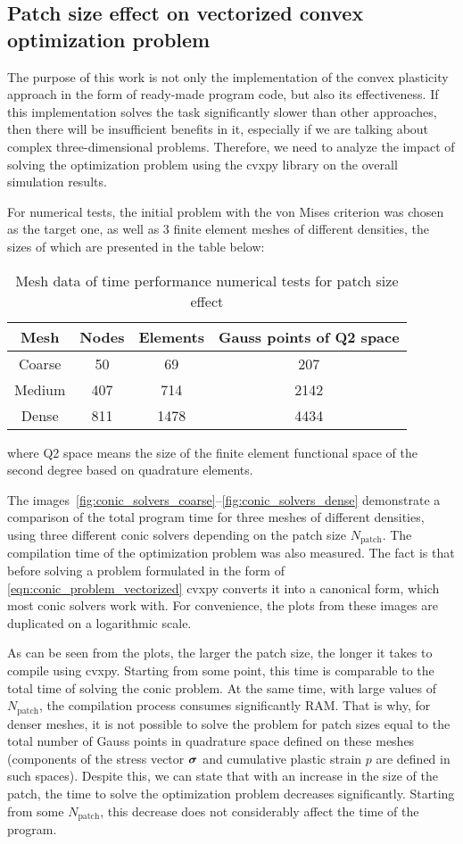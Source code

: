 \documentclass[12pt]{article}
\begin{document}
\subsection{Patch size effect on vectorized convex optimization problem}
The purpose of this work is not only the implementation of the convex plasticity approach in the form of ready-made program code, but also its effectiveness. If this implementation solves the task significantly slower than other approaches, then there will be insufficient benefits in it, especially if we are talking about complex three-dimensional problems. Therefore, we need to analyze the impact of solving the optimization problem using the cvxpy library on the overall simulation results. 

For numerical tests, the initial problem with the von Mises criterion was chosen as the target one, as well as 3 finite element meshes of different densities, the sizes of which are presented in the table below:

\begin{table}[H]
	\centering
	\begin{tabular}{|cccc|}
		\hline
		Mesh & Nodes & Elements & Gauss points of Q2 space \\
		\hline
		Coarse & 50	& 69 & 207 \\
		Medium & 407 & 714 & 2142 \\
		Dense & 811	& 1478 & 4434 \\
		\hline
	\end{tabular}
	\caption{Mesh data of time performance numerical tests for patch size effect}
    \label{tab:cvxpy_tests}
\end{table}
where Q2 space means the size of the finite element functional space of the second degree based on quadrature elements.

The images~\ref{fig:conic_solvers_coarse}--\ref{fig:conic_solvers_dense} demonstrate a comparison of the total program time for three meshes of different densities, using three different conic solvers depending on the patch size $N_\text{patch}$. The compilation time of the optimization problem was also measured. The fact is that before solving a problem formulated in the form of \ref{eqn:conic_problem_vectorized} cvxpy converts it into a canonical form, which most conic solvers work with. For convenience, the plots from these images are duplicated on a logarithmic scale.

As can be seen from the plots, the larger the patch size, the longer it takes to compile using cvxpy. Starting from some point, this time is comparable to the total time of solving the conic problem. At the same time, with large values of $N_\text{patch}$, the compilation process consumes significantly RAM. That is why, for denser meshes, it is not possible to solve the problem for patch sizes equal to the total number of Gauss points in quadrature space defined on these meshes (components of the stress vector $\mbox{\boldmath$\sigma$}$ and cumulative plastic strain $p$ are defined in such spaces). Despite this, we can state that with an increase in the size of the patch, the time to solve the optimization problem decreases significantly. Starting from some $N_\text{patch}$, this decrease does not considerably affect the time of the program.
\end{document}
